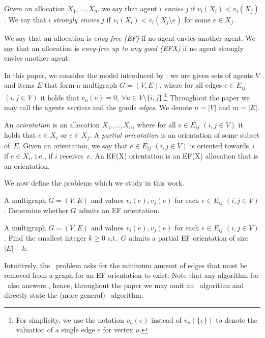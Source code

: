 \begin{definition}[Envy]\label{def:envy}
    Given an allocation $X_1,\ldots,X_n$, we say that agent $i$ \emph{envies} $j$ if
    $v_i(X_i) < v_i(X_j)$. We say that $i$ \emph{strongly envies} $j$ if $v_i(X_i) < v_i(X_j \setminus e)$ for some $e \in X_j$.
\end{definition}

\begin{definition}\label{def:fair_alloc}
    We say that an allocation is \emph{envy-free (EF)} if no agent envies another agent. We say that an allocation is \emph{envy-free up to any good (EFX)} if no agent strongly envies another agent. 
\end{definition}






In this paper, we consider the model introduced by \cite{EFXgraphs}: we are given sets of agents $V$ and items $E$ that form a multigraph $G=(V,E)$, where for all edges $e\in E_{ij}$ $(i,j \in V)$ it holds that $v_u(e)=0$, $\forall u\in V\setminus\{i,j\}$.\footnote{For simplicity, we use the notation $v_u(e)$ instead of $v_u(\{e\})$ to denote the valuation of a single edge $e$ for vertex $u$.} Throughout the paper we may call the agents \textit{vertices} and the goods \textit{edges}. We denote $n=|V|$ and $m=|E|$.




An \emph{orientation} is an allocation $X_1,\ldots,X_n$, where for all $e\in E_{ij}$ $(i,j \in V)$ it holds that $e\in X_i$ or $e\in X_j$. A \emph{partial orientation} is an orientation of some subset of~$E$. Given an orientation, we say that $e\in E_{ij}$ $(i,j \in V)$ is oriented towards~$i$ if $e\in X_i$, i.e., if $i$ receives~$e$. An EF(X) orientation is an EF(X) allocation that is an orientation.






We now define the problems which we study in this work.

{A multigraph $G=(V,E)$ and values $v_i(e), v_j(e)$ for each $e\in E_{ij}$ $(i,j \in V)$.}
{Determine whether $G$ admits an EF orientation.}\label{def:EFo}

{A multigraph $G=(V,E)$ and values $v_i(e), v_j(e)$ for each $e\in E_{ij}$ $(i,j \in V)$.}
{Find the smallest integer $k\geq 0$ s.t.~$G$ admits a partial EF orientation of size $|E|-k$.} \label{def:mc_EFo}

Intuitively, the \EFmc\ problem asks for the minimum amount of edges that must be removed from a graph for an EF orientation to exist. Note that any algorithm for \EFmc\ also answers \EFo, hence, throughout the paper we may omit an \EFo\ algorithm and directly state the (more general) \EFmc\ algorithm.


